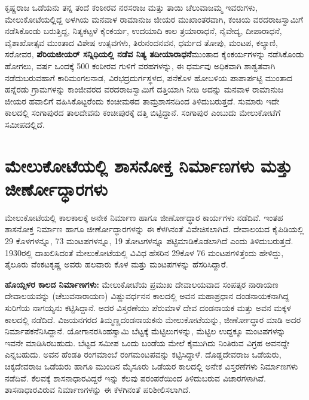 ಕೃಷ್ಣರಾಜ ಒಡೆಯನು ತನ್ನ ತಂದೆ ಕಂಠೀರವ ನರಸರಾಜ ಮತ್ತು ತಾಯಿ ಚೆಲುವಾಜಮ್ಮ ಇವರುಗಳು, ಮೇಲುಕೋಟೆ\-ಯಲ್ಲಿದ್ದ ಅಳಗಿಯ ಮನವಾಳ ರಾಮಾನುಜ ಜೀಯರ ಮುಖಾಂತರವಾಗಿ, ಕಂಚಿಯ ವರದರಾಜಸ್ವಾಮಿಗೆ ನಡೆಸಿಕೊಂಡು ಬರುತ್ತಿದ್ದ, ನಿತ್ಯಕಟ್ಟಳೆ ಕೈಂಕರ್ಯ, ಉದಯಾದಿ ಕಾಲ ತ್ರಯಾರಾಧನೆ, ನೈವೇದ್ಯ, ದೀಪಾರಾಧನೆ, ವೈಶಾಖೋತ್ಸವ ಮುಂತಾದ ವಿಶೇಷ ಉತ್ಸವಗಳು, ತಿರುನಂದನವನ, ಧರ್ಮದ ತೋಪು, ಮಂಟಪ, ಕಲ್ಯಾಣಿ, ಸರೋವರ, \textbf{ಪೆರಿಯಜೀಯರ್​ ಸನ್ನಿಧಿಯಲ್ಲಿ ನಡೆವ ನಿತ್ಯ ತದೀಯಾರಾಧನೆ}ಮುಂತಾದ ಕೈಂಕರ್ಯಗಳನ್ನು ನಡೆಸಿಕೊಂಡು ಹೋಗಲು, ವರ್ಷ ಒಂದಕ್ಕೆ 500 ಕಂಠೀರವ ಗುಳಿಗೆ ವರಹಗಳನ್ನು, ಈ ಧರ್ಮವು ಅಧಿಕವಾಗಿ ಶಾಶ್ವತವಾಗಿ ನಡೆದುಬರುವಹಾಗೆ ಕಾರಿಮಂಗಲನಾಡ, ವಿರಭದ್ರದುರ್ಗಸ್ಥಳದ, ಪನೆಕೊಳ ಹೋಬಳಿಯ ಪಾಪಾರ್ಪಟ್ಟಿ ಮುಂತಾದ ಹನ್ನೆರಡು ಗ್ರಾಮಗಳನ್ನು ಕಾಂಜೀವರದ ವರದರಾಜಸ್ವಾಮಿಗೆ ದತ್ತಿಯಾಗಿ ನೀಡಿ ಅದನ್ನು ಮನವಾಳ ರಾಮಾನುಜ ಜೀಯರ ಹವಾಲಿಗೆ ವಹಿಸಿಕೊಟ್ಟರೆಂದು ಕಂಚೀಮಠದ ತಾಮ್ರಶಾಸನದಿಂದ ತಿಳಿದುಬರುತ್ತದೆ. ಸುಮಾರು ಇದೇ ಕಾಲದಲ್ಲಿ ಸಂಗಾಪುರದ ತಾಲದೇವನು ಕಂಚೀಪುರಕ್ಕೆ ದತ್ತಿ ಬಿಟ್ಟಿದ್ದಾನೆ. ಸಂಗಾಪುರ ಎಂಬುದು ಮೇಲುಕೋಟೆಗೆ ಸಮೀಪದಲ್ಲಿದೆ.


\section*{ಮೇಲುಕೋಟೆಯಲ್ಲಿ ಶಾಸನೋಕ್ತ ನಿರ್ಮಾಣಗಳು ಮತ್ತು ಜೀರ್ಣೋದ್ಧಾರಗಳು}

ಮೇಲುಕೋಟೆಯಲ್ಲಿ ಕಾಲಕಾಲಕ್ಕೆ ಅನೇಕ ನಿರ್ಮಾಣ ಹಾಗೂ ಜೀರ್ಣೋದ್ಧಾರ ಕಾರ್ಯಗಳು ನಡೆದಿವೆ. ಇಂತಹ ಶಾಸನೋಕ್ತ ನಿರ್ಮಾಣ ಹಾಗೂ ಜೀರ್ಣೋದ್ಧಾರಗಳನ್ನು ಈ ಕೆಳಗಿನಂತೆ ವಿವೇಚಿಸಲಾಗಿದೆ. ದೇವಾಲಯದ ಕೈಪಿಡಿಯಲ್ಲಿ 29 ಕೊಳಗಳನ್ನೂ, 73 ಮಂಟಪಗಳನ್ನೂ, 19 ತೋಟಗಳನ್ನೂ ಪಟ್ಟಿಮಾಡಿಕೊಡಲಾಗಿದೆ ಎಂದು ತಿಳಿದುಬರುತ್ತದೆ. 1930ರಲ್ಲಿ ದಾಖಲಿಸಿದಂತೆ ಮೇಲುಕೋಟೆಯಲ್ಲಿ ವಿವಿಧ ಹೆಸರಿನ 29ಕೊಳ 76 ಮಂಟಪಗಳಿತ್ತೆಂದು ಹೇಳಿದ್ದು, ತೈಲೂರು ವೆಂಕಟಕೃಷ್ಣ ಅವರು ಹಲವಾರು ಕೊಳ ಮತ್ತು ಮಂಟಪಗಳನ್ನು ಹೆಸರಿಸಿದ್ದಾರೆ.

\textbf{ಹೊಯ್ಸಳರ ಕಾಲದ ನಿರ್ಮಾಣಗಳು:} ಮೇಲುಕೋಟೆಯ ಪ್ರಮುಖ ದೇವಾಲಯವಾದ ಸಂಪತ್ಕರ ನಾರಾಯಣ ದೇವಾಲಯವನ್ನು (ಚೆಲುವನಾರಾಯಣ) ವಿಷ್ಣುವರ್ಧನನ ಕಾಲದಲ್ಲಿ ಅವನ ಮಹಾಪ್ರಧಾನ ದಂಡನಾಯಕನಾಗಿದ್ದ ಸುರಿಗೆಯ ನಾಗಯ್ಯನು ಕಟ್ಟಿಸಿದ್ದಾನೆ. ಅದರ ವಿಸ್ತರಣೆಯು ಪೆರುಮಾಳೆ ದೇವ ದಂಡನಾಯಕ ಮತ್ತು ಅವನ ಮಕ್ಕಳ ಕಾಲದಲ್ಲಿ ನಡೆದಿದೆ. ವಿಜಯನಗರದ ತಿಮ್ಮಣ್ಣದಂಡನಾಯಕನು ಮೇಲುಕೋಟೆಯನ್ನು, ಜೀರ್ಣೋದ್ಧಾರ ಮಾಡಿ ಅದರ ನಿರ್ಮಾಪಕನೆನಿಸಿದ್ದಾನೆ. ಯೋಗಾನರಸಿಂಹಸ್ವಾಮಿ ಬೆಟ್ಟಕ್ಕೆ ಮೆಟ್ಟಿಲುಗಳನ್ನು, ಮೆಟ್ಟಿಲ ಉದ್ದಕ್ಕೂ ಮಂಟಪಗಳನ್ನು ಇವನೇ ಮಾಡಿಸಿರಬಹುದು. ಬೆಟ್ಟದ ಸಮೀಪ ಒಂದು ಬಂಡೆಯ ಮೇಲೆ ಕೈಮುಗಿದು ನಿಂತಿರುವ ವಿಗ್ರಹ ಅವನದ್ದೇ ಎನ್ನಬಹುದು. ಅವನ ಹೆಂಡತಿ ರಂಗಮಾಂಬೆ ರಂಗಮಂಟಪವನ್ನು ಕಟ್ಟಿಸಿದ್ದಾಳೆ. ದೊಡ್ಡದೇವರಾಜ ಒಡೆಯರು, ಚಿಕ್ಕದೇವರಾಜ ಒಡೆಯರು ಹಾಗೂ ಮುಂದಿನ ಮೈಸೂರು ಒಡೆಯರ ಕಾಲದಲ್ಲಿ ಅನೇಕ ವಿಸ್ತರಣೆಗಳು ನಿರ್ಮಾಣಗಳು ನಡೆದಿವೆ. ಕೆಲವಕ್ಕೆ ಶಾಸನಾಧಾರವಿದ್ದರೆ ಇನ್ನು ಕೆಲವು ಪರಂಪರೆಯಿಂದ ತಿಳಿದುಬರುವ ವಿಚಾರಗಳಾಗಿವೆ. ಶಾಸನಾಧಾರವಿರುವ ನಿರ್ಮಾಣಗಳನ್ನು ಈ ಕೆಳಗಿನಂತೆ ಪರಿಶೀಲಿಸಲಾಗಿದೆ.

